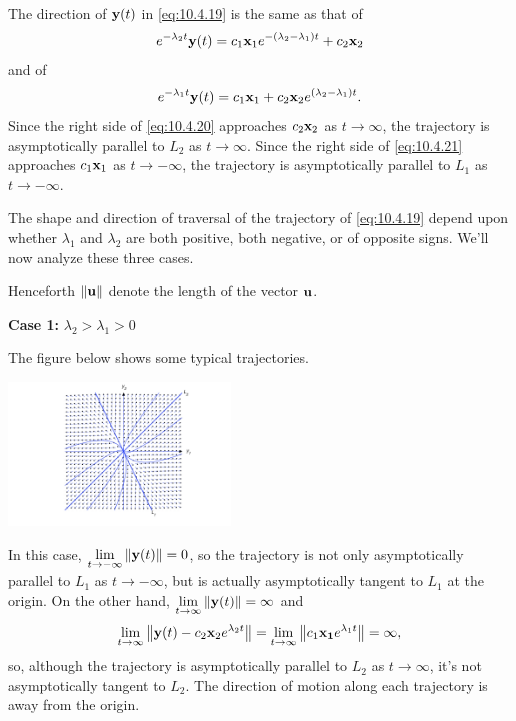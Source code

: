 \documentclass{ximera}
\begin{document}
The direction of ${\bf y}(t)$ in \eqref{eq:10.4.19} is the
same as that of
\begin{equation} \label{eq:10.4.20}
e^{-\lambda_2 t}{\bf y}(t)=
c_1{\bf x}_1e^{-(\lambda_2-\lambda_1)t}+c_2{\bf x}_2
\end{equation}
and of
\begin{equation} \label{eq:10.4.21}
e^{-\lambda_1 t}{\bf y}(t)=c_1{\bf
x}_1+c_2{\bf x}_2e^{(\lambda_2-\lambda_1)t}.
\end{equation}
Since the right side of \eqref{eq:10.4.20} approaches $c_2{\bf x}_2$ as
$t\rightarrow\infty$, the trajectory is asymptotically parallel to $L_2$ as
$t\rightarrow\infty$. Since the right side of \eqref{eq:10.4.21} approaches
$c_1{\bf x}_1$ as $t\rightarrow-\infty$, the trajectory is asymptotically
parallel to $L_1$ as $t\rightarrow -\infty$.

The shape and direction of
traversal of the trajectory of \eqref{eq:10.4.19} depend upon whether
$\lambda_1$ and $\lambda_2$ are both positive, both negative, or of
opposite signs. We'll now analyze these three cases.

Henceforth $\left\lVert{\bf u}\right\rVert$  denote the length of the vector
${\bf u}$.




{\bf Case 1:} $\lambda_2>\lambda_1>0$

The figure below  shows some
 typical trajectories.
 
 \begin{image}
 \includegraphics[height=1.5in]{fig100404.jpg} 
\end{image}
 
In this case, $\lim_{t\rightarrow -\infty}\norm{{\bf y}(t)}=0$, so the trajectory
is not only asymptotically parallel to $L_1$ as $t\rightarrow -\infty$, but is
actually asymptotically tangent to $L_1$ at the origin. On
the other hand, $\lim_{t\rightarrow\infty}\norm{{\bf y}(t)}=\infty$ and
$$
\lim_{t\rightarrow\infty}\norm{{\bf y}(t)-c_2{\bf x}_2e^{\lambda_2
t}}=\lim_{t\rightarrow\infty}\norm{c_1{\bf x_1}e^{\lambda_1t}}=\infty,
$$
so, although the trajectory is asymptotically parallel to $L_2$ as
$t\rightarrow\infty$, it's not asymptotically tangent to $L_2$.
The direction of motion along each trajectory is away from the origin.
\end{document}

